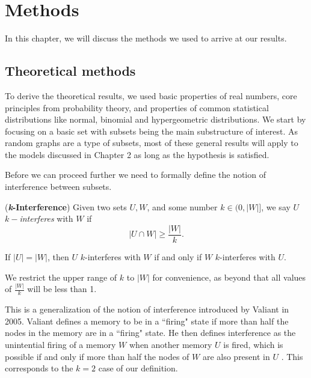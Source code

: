 \chapter{Methods}

In this chapter, we will discuss the methods we used to arrive at our results. 

\section{Theoretical methods}

To derive the theoretical results, we used basic properties of real numbers, core principles from probability theory, and properties of common statistical distributions like normal, binomial and hypergeometric distributions. We start by focusing on a basic set with subsets being the main substructure of interest. As random graphs are a type of subsets, most of these general results will apply to the models discussed in Chapter 2 as long as the hypothesis is satisfied. 

Before we can proceed further we need to formally define the notion of interference between subsets. 

\begin{definition}
    (\textbf{\textit{k}-Interference}) Given two sets $U, W$, and some number $k \in (0,|W|]$, we say $U$ $k-$\textit{interferes} with $W$ if 
    \begin{equation}
        |U \cap W| \ge  \frac{|W|}{k}.
    \end{equation}
\end{definition}

\begin{corollary}
    \label{collorary:k-int-equals}
        If $|U| = |W|$, then $U$ $k$-interferes with $W$ if and only if $W$ $k$-interferes with $U$.
    \end{corollary}
    
We restrict the upper range of $k$ to $|W|$ for convenience, as beyond that all values of $\frac{|W|}{k}$ will be less than 1.

This is a generalization of the notion of interference introduced by Valiant in 2005. Valiant defines a memory to be in a ``firing" state if more than half the nodes in the memory are in a ``firing" state. He then defines interference as the unintential firing of a memory $W$ when another memory $U$ is fired, which is possible if and only if more than half the nodes of $W$ are also present in $U$ \cite{valiant2005memorization}. This corresponds to the $k = 2$ case of our definition. 

